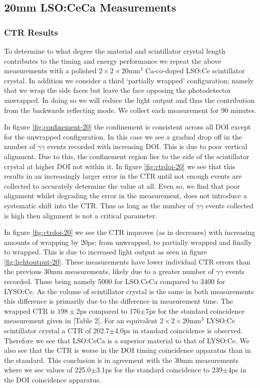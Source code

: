 \subsection{20mm LSO:CeCa Measurements}
\label{sec:20mm}
\subsubsection{CTR Results}
To determine to what degree the material and scintillator crystal length contributes to the timing and energy performance we repeat the above measurements with a polished $2\times2\times20$mm$^3$ Ca-co-doped LSO:Ce scintillator crystal. In addition we consider a third `partially wrapped' configuration; namely that we wrap the side faces but leave the face opposing the photodetector unwrapped. In doing so we will reduce the light output and thus the contribution from the backwards reflecting mode. We collect each measurement for 90 minutes.

In figure \ref{fig:confinement-20} the confinement is consistent across all DOI except for the unwrapped configuration. In this case we see a gradual drop off in the number of $\gamma\gamma$ events recorded with increasing DOI. This is due to poor vertical alignment. Due to this, the confinement region lies to the side of the scintillator crystal at higher DOI not within it. In figure \ref{fig:ctrdoi-20} we see that this results in an increasingly larger error in the CTR until not enough events are collected to accurately determine the value at all. Even so, we find that poor alignment whilst degrading the error in the measurement, does not introduce a systematic shift into the CTR. Thus as long as the number of $\gamma\gamma$ events collected is high then alignment is not a critical parameter. 

In figure \ref{fig:ctrdoi-20} we see the CTR improves (as in decreases) with increasing amounts of wrapping by 20ps; from unwrapped, to partially wrapped and finally to wrapped. This is due to increased light output as seen in figure \ref{fig:lightoutput-20}. These measurements have lower individual CTR errors than the previous 30mm measurements, likely due to a greater number of $\gamma\gamma$ events recorded. These being namely 5000 for LSO:CeCa compared to 3400 for LYSO:Ce. As the volume of scintillator crystal is the same in both measurements this difference is primarily due to the difference in measurement time. The wrapped CTR is $198\pm2$ps compared to 176$\pm$7ps for the standard coincidence measurement given in [Table 2]\cite{uffray_Jarron_Meyer_Lecoq_2014}. For an equivalent $2\times2\times20$mm$^3$ LYSO:Ce scintillator crystal a CTR of 202.7$\pm$4.0ps in standard coincidence is observed. Therefore we see that LSO:CeCa is a superior material to that of LYSO:Ce. We also see that the CTR is worse in the DOI timing coincidence apparatus than in the standard. This conclusion is in agreement with the 30mm measurements where we see values of 225.0$\pm$3.1ps for the standard coincidence to 239$\pm$4ps in the DOI coincidence apparatus.

